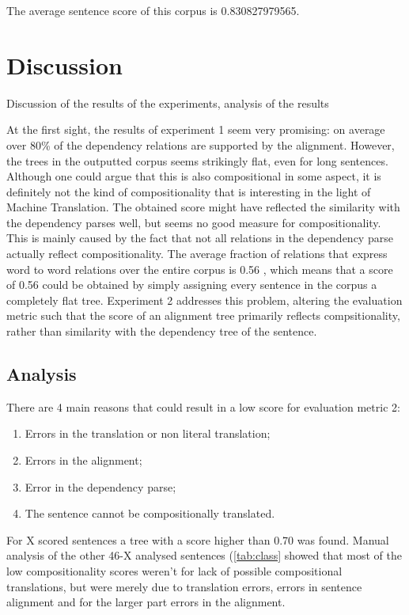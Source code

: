 \documentclass{report}
\theoremstyle{indented}
\begin{document}
The average sentence score of this corpus is 0.830827979565.

\section{Discussion}

Discussion of the results of the experiments, analysis of the results

At the first sight, the results of experiment 1 seem very promising: on average over 80\% of the dependency relations are supported by the alignment. However, the trees in the outputted corpus seems strikingly flat, even for long sentences. Although one could argue that this is also compositional in some aspect, it is definitely not the kind of compositionality that is interesting in the light of Machine Translation. The obtained score might have reflected the similarity with the dependency parses well, but seems no good measure for compositionality. This is mainly caused by the fact that not all relations in the dependency parse actually reflect compositionality. The average fraction of relations that express word to word relations over the entire corpus is 0.56 %
, which means that a score of 0.56 could be obtained by simply assigning every sentence in the corpus a completely flat tree. Experiment 2 addresses this problem, altering the evaluation metric such that the score of an alignment tree primarily reflects compsitionality, rather than similarity with the dependency tree of the sentence.


\subsection{Analysis}

There are 4 main reasons that could result in a low score for evaluation metric 2:
\begin{enumerate}
\item Errors in the translation or non literal translation;
\item Errors in the alignment;
\item Error in the dependency parse;
\item The sentence cannot be compositionally translated.
\end{enumerate}

For X scored sentences a tree with a score higher than 0.70 was found. Manual analysis of the other 46-X analysed sentences (\ref{tab:class} showed that most of the low compositionality scores weren't for lack of possible compositional translations, but were merely due to translation errors, errors in sentence alignment and for the larger part errors in the alignment.
\end{document}
